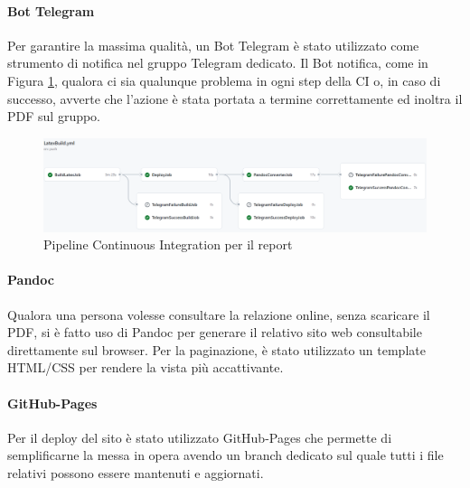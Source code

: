         \paragraph{Bot Telegram}
        Per garantire la massima qualità, un Bot Telegram è stato utilizzato come strumento di notifica nel gruppo Telegram dedicato. Il Bot notifica, come in Figura \ref{fig:CI-Report}, qualora ci sia qualunque problema in ogni step della CI o, in caso di successo, avverte che l'azione è stata portata a termine correttamente ed inoltra il PDF sul gruppo.
            \begin{figure}[H]
                \centering
                \includegraphics[width=1\textwidth]{Images/CI-Report.png}
                \caption{Pipeline Continuous Integration per il report}
                \label{fig:CI-Report}
            \end{figure}

        \paragraph{Pandoc}
        Qualora una persona volesse consultare la relazione online, senza scaricare il PDF, si è fatto uso di Pandoc per generare il relativo sito web consultabile direttamente sul browser. Per la paginazione, è stato utilizzato un template HTML/CSS per rendere la vista più accattivante.
        
        \paragraph{GitHub-Pages}
        Per il deploy del sito è stato utilizzato GitHub-Pages che permette di semplificarne la messa in opera avendo un branch dedicato sul quale tutti i file relativi possono essere mantenuti e aggiornati.


